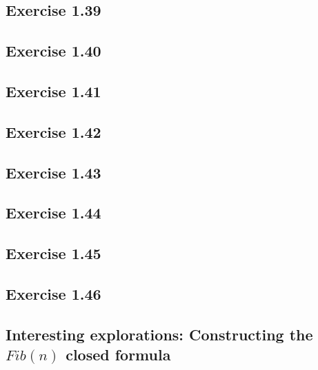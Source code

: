 \documentclass[letterpaper, leqno]{article}
\begin{document}
\subsection*{Exercise 1.39}
%

\subsection*{Exercise 1.40}
%

\subsection*{Exercise 1.41}
%

\subsection*{Exercise 1.42}
%

\subsection*{Exercise 1.43}
%

\subsection*{Exercise 1.44}
%

\subsection*{Exercise 1.45}
%

\subsection*{Exercise 1.46}
%

\subsection*{Interesting explorations: Constructing the $Fib(n)$ closed formula}
\end{document}
